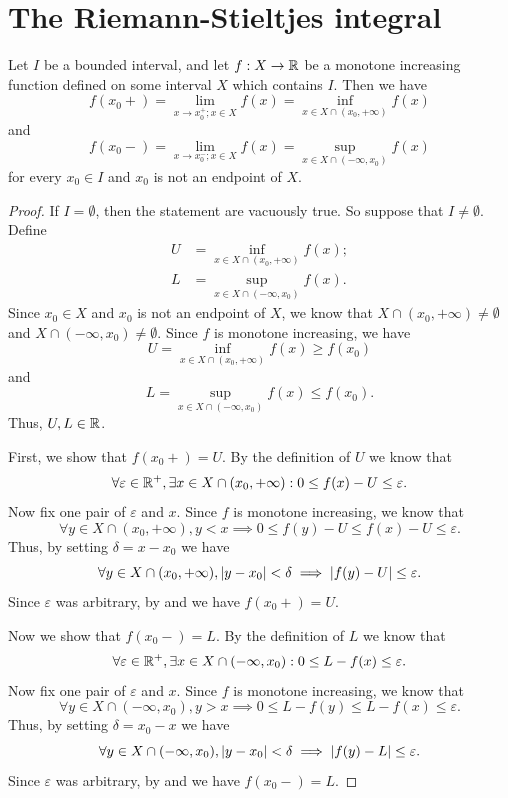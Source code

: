 \section{The Riemann-Stieltjes integral}\label{i:sec:11.8}

\begin{ac}\label{i:ac:11.8.1}
  Let \(I\) be a bounded interval, and let \(f : X \to \mathbb{R}\) be a monotone increasing function defined on some interval \(X\) which contains \(I\).
  Then we have
  \[
    f(x_0+) = \lim_{x \to x_0^+ ; x \in X} f(x) = \inf_{x \in X \cap (x_0, +\infty)} f(x)
  \]
  and
  \[
    f(x_0-) = \lim_{x \to x_0^- ; x \in X} f(x) = \sup_{x \in X \cap (-\infty, x_0)} f(x)
  \]
  for every \(x_0 \in I\) and \(x_0\) is not an endpoint of \(X\).
\end{ac}

\begin{proof}
  If \(I = \emptyset\), then the statement are vacuously true.
  So suppose that \(I \neq \emptyset\).
  Define
  \begin{align*}
    U & = \inf_{x \in X \cap (x_0, +\infty)} f(x); \\
    L & = \sup_{x \in X \cap (-\infty, x_0)} f(x).
  \end{align*}
  Since \(x_0 \in X\) and \(x_0\) is not an endpoint of \(X\), we know that \(X \cap (x_0, +\infty) \neq \emptyset\) and \(X \cap (-\infty, x_0) \neq \emptyset\).
  Since \(f\) is monotone increasing, we have
  \[
    U = \inf_{x \in X \cap (x_0, +\infty)} f(x) \geq f(x_0)
  \]
  and
  \[
    L = \sup_{x \in X \cap (-\infty, x_0)} f(x) \leq f(x_0).
  \]
  Thus, \(U, L \in \mathbb{R}\).

  First, we show that \(f(x_0+) = U\).
  By the definition of \(U\) we know that
  \[
    \forall \varepsilon \in \mathbb{R}^+, \exists x \in X \cap (x_0, +\infty) : 0 \leq f(x) - U \leq \varepsilon.
  \]
  Now fix one pair of \(\varepsilon\) and \(x\).
  Since \(f\) is monotone increasing, we know that
  \[
    \forall y \in X \cap (x_0, +\infty), y < x \implies 0 \leq f(y) - U \leq f(x) - U \leq \varepsilon.
  \]
  Thus, by setting \(\delta = x - x_0\) we have
  \[
    \forall y \in X \cap (x_0, +\infty), \left\lvert y - x_0\right\rvert < \delta \implies \left\lvert f(y) - U\right\rvert \leq \varepsilon.
  \]
  Since \(\varepsilon\) was arbitrary, by  and  we have \(f(x_0+) = U\).

  Now we show that \(f(x_0-) = L\).
  By the definition of \(L\) we know that
  \[
    \forall \varepsilon \in \mathbb{R}^+, \exists x \in X \cap (-\infty, x_0) : 0 \leq L - f(x) \leq \varepsilon.
  \]
  Now fix one pair of \(\varepsilon\) and \(x\).
  Since \(f\) is monotone increasing, we know that
  \[
    \forall y \in X \cap (-\infty, x_0), y > x \implies 0 \leq L - f(y) \leq L - f(x) \leq \varepsilon.
  \]
  Thus, by setting \(\delta = x_0 - x\) we have
  \[
    \forall y \in X \cap (-\infty, x_0), \left\lvert y - x_0\right\rvert < \delta \implies \left\lvert f(y) - L\right\rvert \leq \varepsilon.
  \]
  Since \(\varepsilon\) was arbitrary, by  and  we have \(f(x_0-) = L\).
\end{proof}

